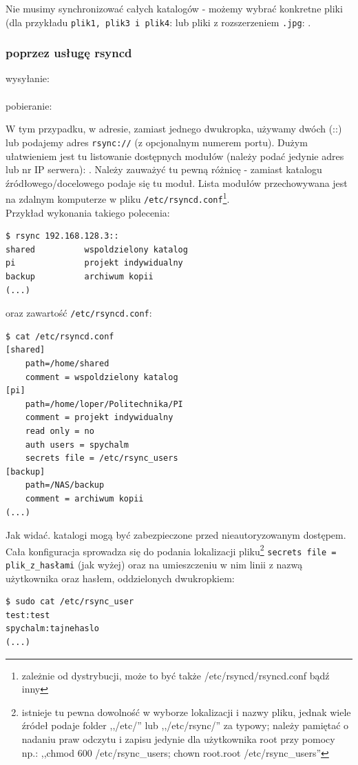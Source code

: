 Nie musimy synchronizować całych katalogów - możemy wybrać konkretne pliki (dla przykładu \verb|plik1, plik3 i plik4|:  lub pliki z rozszerzeniem \verb|.jpg|: .

\subsubsection{poprzez usługę rsyncd}
\label{demon}
\begin{center}
wysyłanie:
 \\
 \\
pobieranie:
 \\
\end{center}

W tym przypadku, w adresie, zamiast jednego dwukropka, używamy dwóch (::) lub podajemy adres \verb|rsync://| (z opcjonalnym numerem portu). Dużym ułatwieniem jest tu listowanie dostępnych modułów (należy podać jedynie adres lub nr IP serwera): . Należy zauważyć tu pewną różnicę - zamiast katalogu źródłowego/docelowego podaje się tu moduł. Lista modułów przechowywana jest na zdalnym komputerze w pliku \verb|/etc/rsyncd.conf|\footnote{zależnie od dystrybucji, może to być także /etc/rsyncd/rsyncd.conf bądź inny}.\\
Przykład wykonania takiego polecenia:
\begin{verbatim}
$ rsync 192.168.128.3::
shared          wspoldzielony katalog
pi              projekt indywidualny
backup          archiwum kopii
(...)
\end{verbatim}
oraz zawartość \verb|/etc/rsyncd.conf|:
\begin{verbatim}
$ cat /etc/rsyncd.conf
[shared]
    path=/home/shared
    comment = wspoldzielony katalog
[pi]
    path=/home/loper/Politechnika/PI
    comment = projekt indywidualny
    read only = no
    auth users = spychalm
    secrets file = /etc/rsync_users
[backup]
    path=/NAS/backup
    comment = archiwum kopii
(...)
\end{verbatim}
Jak widać. katalogi mogą być zabezpieczone przed nieautoryzowanym dostępem. Cała konfiguracja sprowadza się do podania lokalizacji pliku\footnote{istnieje tu pewna dowolność w wyborze lokalizacji i nazwy pliku, jednak wiele źródeł podaje folder ,,/etc/'' lub ,,/etc/rsync/'' za typowy; należy pamiętać o nadaniu praw odczytu i zapisu jedynie dla użytkownika root przy pomocy np.: ,,chmod 600 /etc/rsync\_users; chown root.root /etc/rsync\_users''} \verb|secrets file = plik_z_hasłami| (jak wyżej) oraz na umieszczeniu w nim linii z nazwą użytkownika oraz hasłem, oddzielonych dwukropkiem: 
\begin{verbatim}
$ sudo cat /etc/rsync_user
test:test
spychalm:tajnehaslo
(...)
\end{verbatim}

